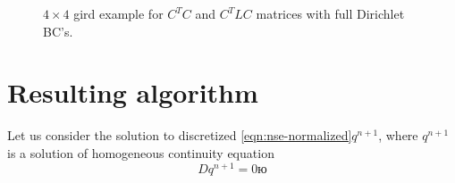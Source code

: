 \documentclass{article}
\numberwithin{equation}{section}
\begin{document}
\begin{figure}[H] %
  \caption{$4\times 4$ gird example for $C^TC$ and $C^TLC$ matrices with full Dirichlet BC's.}\label{fig:CTLC-4x4}
\end{figure}



\section{Resulting algorithm}\label{sec:algorithm}

Let us consider the solution to discretized \cref{eqn:nse-normalized}$q^{n+1}$,
where $q^{n+1}$ is a solution of homogeneous continuity equation 
\begin{equation}\label{eqn:discrete-homogeneous-continuity}
	Dq^{n+1}=0ю
\end{equation}
\end{document}

